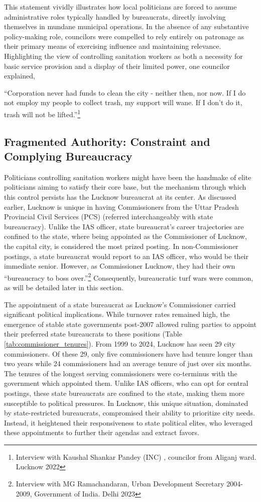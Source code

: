 This statement vividly illustrates how local politicians are forced to assume administrative roles typically handled by bureaucrats, directly involving themselves in mundane municipal operations. In the absence of any substantive policy-making role, councilors were compelled to rely entirely on patronage as their primary means of exercising influence and maintaining relevance. Highlighting the view of controlling sanitation workers as both a necessity for basic service provision and a display of their limited power, one councilor explained,

``Corporation never had funds to clean the city - neither then, nor now. If I do not employ my people to collect trash, my support will wane. If I don't do it, trash will not be lifted.''\footnote{Interview with Kaushal Shankar Pandey (INC) , councilor from Aliganj ward. Lucknow 2022}

\subsection{Fragmented Authority: Constraint and Complying Bureaucracy}

Politicians controlling sanitation workers might have been the handmake of elite politicians aiming to satisfy their core base, but the mechanism through which this control persists has the Lucknow bureaucrat at its center. As discussed earlier, Lucknow is unique in having Commissioners from the Uttar Pradesh Provincial Civil Services (PCS) (referred interchangeably with state bureaucracy). Unlike the IAS officer, state bureaucrat's career trajectories are confined to the state, where being appointed as the Commissioner of Lucknow, the capital city, is considered the most prized posting. In non-Commissioner postings, a state bureaucrat would report to an IAS officer, who would be their immediate senior. However, as Commissioner Lucknow, they had their own ``bureaucracy to boss over.''\footnote{Interview with MG Ramachandaran, Urban Development Secretary 2004-2009, Government of India. Delhi 2023} Consequently, bureaucratic turf wars were common, as will be detailed later in this section.

The appointment of a state bureaucrat as Lucknow's Commissioner carried significant political implications. While turnover rates remained high, the emergence of stable state governments post-2007 allowed ruling parties to appoint their preferred state bureaucrats to these positions (Table \ref{tab:commissioner_tenures}). From 1999 to 2024, Lucknow has seen 29 city commissioners. Of these 29, only five commissioners have had tenure longer than two years while 24 commissioners had an average tenure of just over six months. The tenures of the longest serving commissioners were co-terminus with the government which appointed them. Unlike IAS officers, who can opt for central postings, these state bureaucrats are confined to the state, making them more susceptible to political pressures. In Lucknow, this unique situation, dominated by state-restricted bureaucrats, compromised their ability to prioritize city needs. Instead, it heightened their responsiveness to state political elites, who leveraged these appointments to further their agendas and extract favors.

